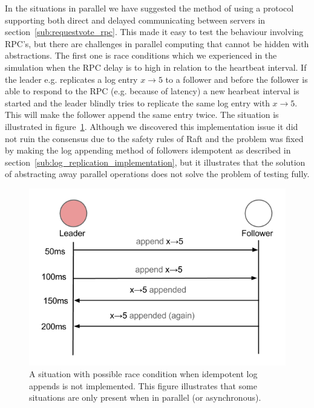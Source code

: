 In the situations in parallel we have suggested the method of using a protocol supporting both direct and delayed communicating between servers in section~\ref{sub:requestvote_rpc}. This made it easy to test the behaviour involving RPC's, but there are challenges in parallel computing that cannot be hidden with abstractions. The first one is race conditions which we experienced in the simulation when the RPC delay is to high in relation to the heartbeat interval. If the leader e.g. replicates a log entry $x\rightarrow5$ to a follower and before the follower is able to respond to the RPC (e.g. because of latency) a new hearbeat interval is started and the leader blindly tries to replicate the same log entry with $x\rightarrow5$. This will make the follower append the same entry twice. The situation is illustrated in figure~\ref{fig:replication_race_condition}. Although we discovered this implementation issue it did not ruin the consensus due to the safety rules of Raft and the problem was fixed by making the log appending method of followers idempotent as described in section~\ref{sub:log_replication_implementation}, but it illustrates that the solution of abstracting away parallel operations does not solve the problem of testing fully.

\begin{figure}
\centering
\includegraphics[scale = 0.4]{figures/replication_race_condition.png}
\caption{A situation with possible race condition when idempotent log appends is not implemented. This figure illustrates that some situations are only present when in parallel (or asynchronous).}
\label{fig:replication_race_condition}
\end{figure}

